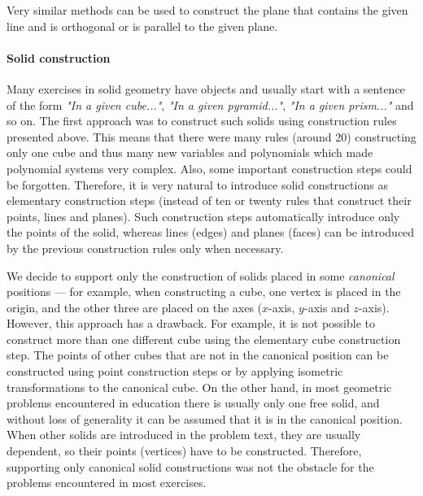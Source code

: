 \documentclass[final,1p,times,authoryear]{elsarticle}
\begin{document}
Very similar methods can be used to construct the plane that contains
the given line and is orthogonal or is parallel to the given plane.

\paragraph{Solid construction}
\label{objectconstruction}

Many exercises in solid geometry have objects and usually start with a
sentence of the form {\em "In a given cube..."}, {\em "In a given
  pyramid..."}, {\em "In a given prism..."} and so on. The first
approach was to construct such solids using construction rules
presented above. This means that there were many rules (around 20)
constructing only one cube and thus many new variables and polynomials
which made polynomial systems very complex. Also, some important
construction steps could be forgotten. Therefore, it is very natural
to introduce solid constructions as elementary construction steps
(instead of ten or twenty rules that construct their points, lines and
planes). Such construction steps automatically introduce only the
points of the solid, whereas lines (edges) and planes (faces) can be
introduced by the previous construction rules only when necessary.


We decide to support only the construction of solids placed in some
{\em canonical} positions --- for example, when constructing a cube,
one vertex is placed in the origin, and the other three are placed on
the axes ($x$-axis, $y$-axis and $z$-axis). However, this approach has
a drawback. For example, it is not possible to construct more than one
different cube using the elementary cube construction step. The points
of other cubes that are not in the canonical position can be
constructed using point construction steps or by applying isometric
transformations to the canonical cube. On the other hand, in most
geometric problems encountered in education there is usually only one
free solid, and without loss of generality it can be assumed that it
is in the canonical position. When other solids are introduced in the
problem text, they are usually dependent, so their points (vertices)
have to be constructed. Therefore, supporting only canonical solid
constructions was not the obstacle for the problems encountered in
most exercises.
\end{document}
